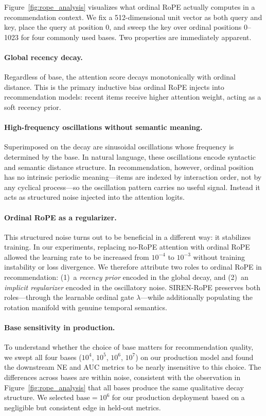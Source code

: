 \documentclass{article}
\begin{document}
Figure~\ref{fig:rope_analysis} visualizes what ordinal RoPE actually computes
in a recommendation context. We fix a 512-dimensional unit vector as both
query and key, place the query at position 0, and sweep the key over ordinal
positions 0--1023 for four commonly used bases.  Two properties are
immediately apparent.

\paragraph{Global recency decay.}
Regardless of base, the attention score decays monotonically with ordinal
distance. This is the primary inductive bias ordinal RoPE injects into
recommendation models: recent items receive higher attention weight, acting
as a soft recency prior.

\paragraph{High-frequency oscillations without semantic meaning.}
Superimposed on the decay are sinusoidal oscillations whose frequency is
determined by the base. In natural language, these oscillations encode
syntactic and semantic distance structure. In recommendation, however, ordinal
position has no intrinsic periodic meaning---items are indexed by interaction
order, not by any cyclical process---so the oscillation pattern carries no
useful signal. Instead it acts as structured noise injected into the attention
logits.

\paragraph{Ordinal RoPE as a regularizer.}
This structured noise turns out to be beneficial in a different way: it
stabilizes training. In our experiments, replacing no-RoPE attention with
ordinal RoPE allowed the learning rate to be increased from $10^{-4}$ to
$10^{-3}$ without training instability or loss divergence. We therefore
attribute two roles to ordinal RoPE in recommendation: (1)~a \emph{recency
prior} encoded in the global decay, and (2)~an \emph{implicit regularizer}
encoded in the oscillatory noise. SIREN-RoPE preserves both roles---through
the learnable ordinal gate $\lambda$---while additionally populating the
rotation manifold with genuine temporal semantics.

\paragraph{Base sensitivity in production.}
To understand whether the choice of base matters for recommendation quality,
we swept all four bases ($10^4$, $10^5$, $10^6$, $10^7$) on our production
model and found the downstream NE and AUC metrics to be nearly insensitive to
this choice. The differences across bases are within noise, consistent with
the observation in Figure~\ref{fig:rope_analysis} that all bases produce the
same qualitative decay structure. We selected $\mathrm{base} = 10^6$ for our
production deployment based on a negligible but consistent edge in held-out
metrics.
\end{document}
